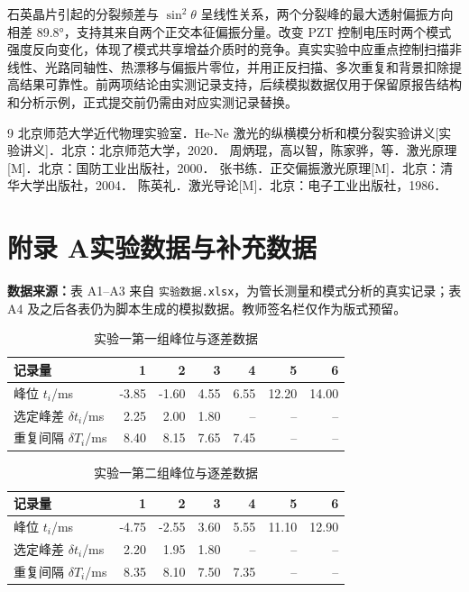\documentclass[UTF8,a4paper,10pt]{ctexart}
\begin{document}
石英晶片引起的分裂频差与 $\sin^2\theta$ 呈线性关系，两个分裂峰的最大透射偏振方向相差 \ang{89.8}，支持其来自两个正交本征偏振分量。改变 PZT 控制电压时两个模式强度反向变化，体现了模式共享增益介质时的竞争。真实实验中应重点控制扫描非线性、光路同轴性、热漂移与偏振片零位，并用正反扫描、多次重复和背景扣除提高结果可靠性。前两项结论由实测记录支持，后续模拟数据仅用于保留原报告结构和分析示例，正式提交前仍需由对应实测记录替换。

\renewcommand{\refname}{六、参考文献}
\begin{thebibliography}{9}
   北京师范大学近代物理实验室．He-Ne 激光的纵横模分析和模分裂实验讲义[实验讲义]．北京：北京师范大学，2020．
   周炳琨，高以智，陈家骅，等．激光原理[M]．北京：国防工业出版社，2000．
   张书练．正交偏振激光原理[M]．北京：清华大学出版社，2004．
   陈英礼．激光导论[M]．北京：电子工业出版社，1986．
\end{thebibliography}

\clearpage
\appendix
\renewcommand{\thetable}{A\arabic{table}}
\setcounter{table}{0}
\section*{附录 A\quad 实验数据与补充数据}

\noindent\textbf{数据来源：}表 A1--A3 来自 \texttt{实验数据.xlsx}，为管长测量和模式分析的真实记录；表 A4 及之后各表仍为脚本生成的模拟数据。教师签名栏仅作为版式预留。

\begin{table}[H]
  \centering
  \caption{实验一第一组峰位与逐差数据}
  \label{tab:exp1-raw}
  \begin{tabular}{lrrrrrr}
    \toprule
    记录量 & 1 & 2 & 3 & 4 & 5 & 6 \\
    \midrule
    峰位 $t_i$/ms & -3.85 & -1.60 & 4.55 & 6.55 & 12.20 & 14.00 \\
    选定峰差 $\delta t_i$/ms & 2.25 & 2.00 & 1.80 & -- & -- & -- \\
    重复间隔 $\delta T_i$/ms & 8.40 & 8.15 & 7.65 & 7.45 & -- & -- \\
    \bottomrule
  \end{tabular}
\end{table}

\begin{table}[H]
  \centering
  \caption{实验一第二组峰位与逐差数据}
  \begin{tabular}{lrrrrrr}
    \toprule
    记录量 & 1 & 2 & 3 & 4 & 5 & 6 \\
    \midrule
    峰位 $t_i$/ms & -4.75 & -2.55 & 3.60 & 5.55 & 11.10 & 12.90 \\
    选定峰差 $\delta t_i$/ms & 2.20 & 1.95 & 1.80 & -- & -- & -- \\
    重复间隔 $\delta T_i$/ms & 8.35 & 8.10 & 7.50 & 7.35 & -- & -- \\
    \bottomrule
  \end{tabular}
\end{table}
\end{document}
